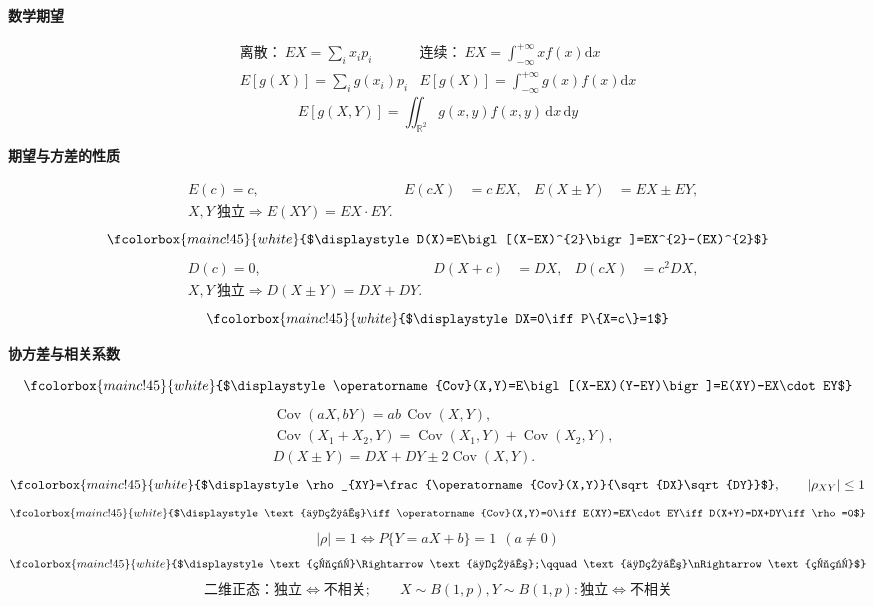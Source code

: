\documentclass[11pt,a4paper]{ctexart}
\newcommand{\hd}[1]{\textbf{\color{mainc!85!black}#1}\par\nobreak\nopagebreak[4]}
\newcommand{\bx}[1]{{\setlength{\fboxsep}{3.4pt}\setlength{\fboxrule}{0.6pt}%
  \fcolorbox{mainc!45}{white}{$\displaystyle #1$}}}
\begin{document}
\begin{secbox}[四、随机变量的数字特征]

\hd{数学期望}
\begin{formbox}
\[
\begin{array}{ll}
\text{离散：}\ EX=\displaystyle\sum_{i}x_{i}p_{i}
& \text{连续：}\ EX=\displaystyle\int_{-\infty}^{+\infty}xf(x)\mathrm dx\\[8pt]
E[g(X)]=\displaystyle\sum_{i}g(x_{i})p_{i}
& E[g(X)]=\displaystyle\int_{-\infty}^{+\infty}g(x)f(x)\mathrm dx
\end{array}
\]
\[
E[g(X,Y)]=\iint_{\mathbb R^{2}}g(x,y)f(x,y)\,\mathrm dx\,\mathrm dy
\]
\end{formbox}

\hd{期望与方差的性质}
\begin{formbox}
\[
\begin{aligned}
&E(c)=c, & E(cX)&=c\,EX, & E(X\pm Y)&=EX\pm EY,\\[3pt]
&X,Y\ \text{独立}\Rightarrow E(XY)=EX\cdot EY.
\end{aligned}
\]
\[
\bx{D(X)=E\bigl[(X-EX)^{2}\bigr]=EX^{2}-(EX)^{2}}
\]
\[
\begin{aligned}
&D(c)=0, & D(X+c)&=DX, & D(cX)&=c^{2}DX,\\[3pt]
&X,Y\ \text{独立}\Rightarrow D(X\pm Y)=DX+DY.
\end{aligned}
\]
\[
\bx{DX=0\iff P\{X=c\}=1}
\]
\end{formbox}

\hd{协方差与相关系数}
\begin{formbox}
\[
\bx{\operatorname{Cov}(X,Y)=E\bigl[(X-EX)(Y-EY)\bigr]=E(XY)-EX\cdot EY}
\]
\[
\begin{aligned}
&\operatorname{Cov}(aX,bY)=ab\,\operatorname{Cov}(X,Y),\\[3pt]
&\operatorname{Cov}(X_{1}+X_{2},Y)=\operatorname{Cov}(X_{1},Y)+\operatorname{Cov}(X_{2},Y),\\[3pt]
&D(X\pm Y)=DX+DY\pm2\operatorname{Cov}(X,Y).
\end{aligned}
\]
\[
\bx{\rho_{XY}=\frac{\operatorname{Cov}(X,Y)}{\sqrt{DX}\sqrt{DY}}},\qquad
|\rho_{XY}|\le1
\]
\[
\bx{\text{不相关}\iff \operatorname{Cov}(X,Y)=0\iff E(XY)=EX\cdot EY\iff D(X+Y)=DX+DY\iff\rho=0}
\]
\[
|\rho|=1\iff P\{Y=aX+b\}=1\ \ (a\ne0)
\]
\[
\bx{\text{独立}\Rightarrow\text{不相关};\qquad \text{不相关}\nRightarrow\text{独立}}
\]
\[
\text{二维正态：独立}\iff\text{不相关};\qquad
X\sim B(1,p),Y\sim B(1,p):\text{独立}\iff\text{不相关}
\]
\end{formbox}


\end{secbox}
\end{document}
